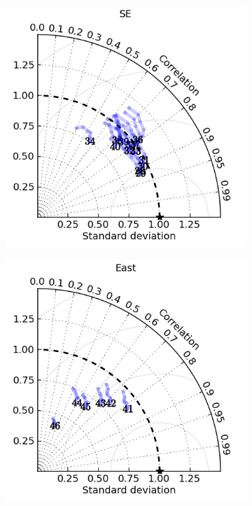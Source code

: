 \begin{figure}[H]
\begin{subfigure}{0.30\textwidth}
        \caption{}
    \end{subfigure}
    \begin{subfigure}{0.30\textwidth}
        \includegraphics[width=\textwidth]{figures/plots/taylor_diag_res_SE.png}
        \caption{}
    \end{subfigure}
    \begin{subfigure}{0.30\textwidth}
        \includegraphics[width=\textwidth]{figures/plots/taylor_diag_res_East.png}

\end{subfigure}
\end{figure}
